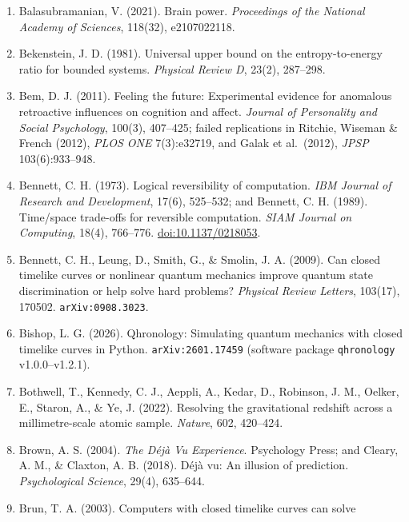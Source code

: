 \documentclass[10pt,letterpaper]{article}
\begin{document}
\begin{enumerate}
  Bacon, D. (2004). Quantum computational complexity in the presence of
  closed timelike curves. \emph{Physical Review A}, 70(3), 032309.
  \href{https://doi.org/10.1103/PhysRevA.70.032309}{doi:10.1103/PhysRevA.70.032309};
  \texttt{arXiv:quant-\allowbreak{}ph/\allowbreak{}0309189}.
\item
  Balasubramanian, V. (2021). Brain power. \emph{Proceedings of the
  National Academy of Sciences}, 118(32), e2107022118.
\item
  Bekenstein, J. D. (1981). Universal upper bound on the
  entropy-to-energy ratio for bounded systems. \emph{Physical Review D},
  23(2), 287--298.
\item
  Bem, D. J. (2011). Feeling the future: Experimental evidence for
  anomalous retroactive influences on cognition and affect.
  \emph{Journal of Personality and Social Psychology}, 100(3), 407--425;
  failed replications in Ritchie, Wiseman \& French (2012), \emph{PLOS
  ONE} 7(3):e32719, and Galak et al.~(2012), \emph{JPSP}
  103(6):933--948.
\item
  Bennett, C. H. (1973). Logical reversibility of computation. \emph{IBM
  Journal of Research and Development}, 17(6), 525--532; and Bennett, C.
  H. (1989). Time/space trade-offs for reversible computation.
  \emph{SIAM Journal on Computing}, 18(4), 766--776.
  \href{https://doi.org/10.1137/0218053}{doi:10.1137/0218053}.
\item
  Bennett, C. H., Leung, D., Smith, G., \& Smolin, J. A. (2009). Can
  closed timelike curves or nonlinear quantum mechanics improve quantum
  state discrimination or help solve hard problems? \emph{Physical
  Review Letters}, 103(17), 170502. \texttt{arXiv:0908.\allowbreak{}3023}.
\item
  Bishop, L. G. (2026). Qhronology: Simulating quantum mechanics with
  closed timelike curves in Python. \texttt{arXiv:2601.\allowbreak{}17459} (software
  package \texttt{qhronology} v1.0.0--v1.2.1).
\item
  Bothwell, T., Kennedy, C. J., Aeppli, A., Kedar, D., Robinson, J. M.,
  Oelker, E., Staron, A., \& Ye, J. (2022). Resolving the gravitational
  redshift across a millimetre-scale atomic sample. \emph{Nature}, 602,
  420--424.
\item
  Brown, A. S. (2004). \emph{The Déjà Vu Experience}. Psychology Press;
  and Cleary, A. M., \& Claxton, A. B. (2018). Déjà vu: An illusion of
  prediction. \emph{Psychological Science}, 29(4), 635--644.
\item
  Brun, T. A. (2003). Computers with closed timelike curves can solve

\end{enumerate}
\end{document}
